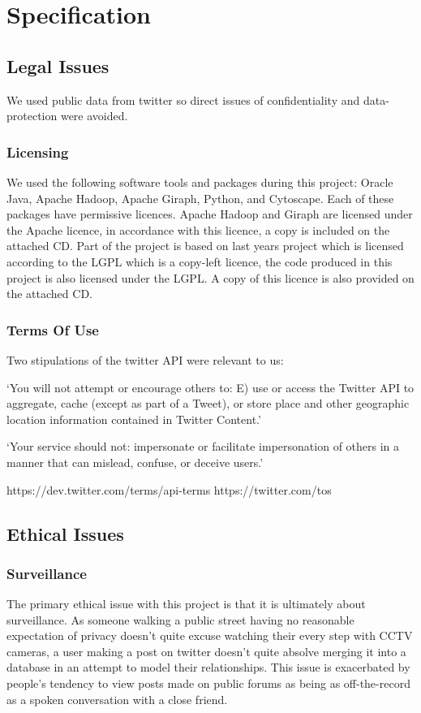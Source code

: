 \chapter{Specification}

\section{Legal Issues}

We used public data from twitter so direct issues of confidentiality and data-protection were avoided.

\subsection{Licensing}

We used the following software tools and packages during this project: Oracle Java, Apache Hadoop, Apache Giraph, Python, and Cytoscape. Each of these packages have permissive licences. Apache Hadoop and Giraph are licensed under the Apache licence, in accordance with this licence, a copy is included on the attached CD. Part of the project is based on last years project which is licensed according to the LGPL which is a copy-left licence, the code produced in this project is also licensed under the LGPL. A copy of this licence is also provided on the attached CD.

\subsection{Terms Of Use}

Two stipulations of the twitter API were relevant to us:

`You will not attempt or encourage others to: E) use or access the Twitter API to aggregate, cache (except as part of a Tweet), or store place and other geographic location information contained in Twitter Content.'

`Your service should not: impersonate or facilitate impersonation of others in a manner that can mislead, confuse, or deceive users.'

https://dev.twitter.com/terms/api-terms
https://twitter.com/tos

\section{Ethical Issues}

\subsection{Surveillance}
The primary ethical issue with this project is that it is ultimately about surveillance. As someone walking a public street having no reasonable expectation of privacy doesn't quite excuse watching their every step with CCTV cameras, a user making a post on twitter doesn't quite absolve merging it into a database in an attempt to model their relationships. This issue is exacerbated by people's tendency to view posts made on public forums as being as off-the-record as a spoken conversation with a close friend.

